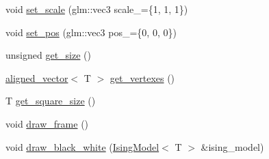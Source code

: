 \begin{DoxyCompactItemize}
void \mbox{\hyperlink{classSpinArray_acc4dd3d5a680c195ebaea00120bd5ed8}{set\+\_\+scale}} (glm\+::vec3 scale\+\_\+=\{1, 1, 1\})
\item 
void \mbox{\hyperlink{classSpinArray_a904e68a8b76d7da16140a0352ae04dfa}{set\+\_\+pos}} (glm\+::vec3 pos\+\_\+=\{0, 0, 0\})
\item 
unsigned \mbox{\hyperlink{classSpinArray_ae7aa5d361c1f3024506291b04e027a7a}{get\+\_\+size}} ()
\item 
\mbox{\hyperlink{type__definitions_8hpp_a087efd587d66b881646ef378f1919c90}{aligned\+\_\+vector}}$<$ T $>$ \mbox{\hyperlink{classSpinArray_ac4a17ebe80ae433662d69537adf9a4de}{get\+\_\+vertexes}} ()
\item 
T \mbox{\hyperlink{classSpinArray_adf314e4c6182e5344e8b793784576677}{get\+\_\+square\+\_\+size}} ()
\item 
void \mbox{\hyperlink{classSpinArray_a0f8e083d6f61a3ebbb5aec9cae749af7}{draw\+\_\+frame}} ()
\item 
void \mbox{\hyperlink{classSpinArray_ab1347f20a673884e1289e4895889a17c}{draw\+\_\+black\+\_\+white}} (\mbox{\hyperlink{classIsingModel}{Ising\+Model}}$<$ T $>$ \&ising\+\_\+model)
\end{DoxyCompactItemize}
